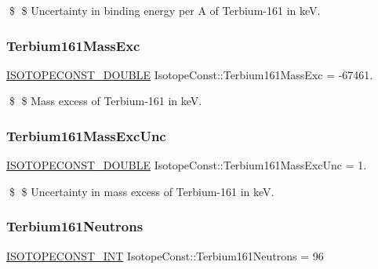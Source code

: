 \$ \$ Uncertainty in binding energy per A of Terbium-\/161 in keV. \mbox{\label{group___isotope_const-_terbium-_tb161_ga52f45da632c253e86883e6454250eee2}} 
\subsubsection{\texorpdfstring{Terbium161\+Mass\+Exc}{Terbium161MassExc}}
{\footnotesize\ttfamily \mbox{\hyperlink{group___isotope_const-_macros_ga8f45a7272ce02c0b4c65c44636ed719a}{I\+S\+O\+T\+O\+P\+E\+C\+O\+N\+S\+T\+\_\+\+D\+O\+U\+B\+LE}} Isotope\+Const\+::\+Terbium161\+Mass\+Exc = -\/67461.}

\$ \$ Mass excess of Terbium-\/161 in keV. \mbox{\label{group___isotope_const-_terbium-_tb161_ga2d929401bd2f9c1f2cdc3834029c97c9}} 
\subsubsection{\texorpdfstring{Terbium161\+Mass\+Exc\+Unc}{Terbium161MassExcUnc}}
{\footnotesize\ttfamily \mbox{\hyperlink{group___isotope_const-_macros_ga8f45a7272ce02c0b4c65c44636ed719a}{I\+S\+O\+T\+O\+P\+E\+C\+O\+N\+S\+T\+\_\+\+D\+O\+U\+B\+LE}} Isotope\+Const\+::\+Terbium161\+Mass\+Exc\+Unc = 1.}

\$ \$ Uncertainty in mass excess of Terbium-\/161 in keV. \mbox{\label{group___isotope_const-_terbium-_tb161_gac19994046300f7e82c99672f38125c65}} 
\subsubsection{\texorpdfstring{Terbium161\+Neutrons}{Terbium161Neutrons}}
{\footnotesize\ttfamily \mbox{\hyperlink{group___isotope_const-_macros_ga5f18360b3e99483a35c32d789e62621c}{I\+S\+O\+T\+O\+P\+E\+C\+O\+N\+S\+T\+\_\+\+I\+NT}} Isotope\+Const\+::\+Terbium161\+Neutrons = 96}

